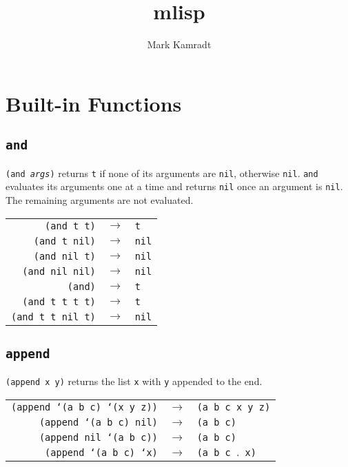 \documentclass[12pt]{article}
\begin{document}
\title{mlisp}
\author{Mark Kamradt}
\maketitle
\section*{Built-in Functions}
\subsection*{\texttt{and}}
\texttt{(and \emph{args})} returns \texttt{t} if none of its arguments are \texttt{nil}, otherwise \texttt{nil}.
\texttt{and} evaluates its arguments one at a time and returns \texttt{nil} once an argument is \texttt{nil}.
The remaining arguments are not evaluated.
\begin{center}
\begin{tabular}{rcl}
\texttt{(and t t)} & $\to$ & \texttt{t} \\
\texttt{(and t nil)} & $\to$ & \texttt{nil} \\
\texttt{(and nil t)} & $\to$ & \texttt{nil} \\
\texttt{(and nil nil)} & $\to$ & \texttt{nil} \\
\texttt{(and)} & $\to$ & \texttt{t} \\
\texttt{(and t t t t)} & $\to$ & \texttt{t} \\
\texttt{(and t t nil t)} & $\to$ & \texttt{nil}
\end{tabular}
\end{center}
\subsection*{\texttt{append}}
\texttt{(append x y)} returns the list \texttt{x} with \texttt{y} appended to the end.
\begin{center}
\begin{tabular}{rcl}
\texttt{(append `(a b c) `(x y z))} & $\to$ & \texttt{(a b c x y z)} \\
\texttt{(append `(a b c) nil)} & $\to$ & \texttt{(a b c)} \\
\texttt{(append nil `(a b c))} & $\to$ & \texttt{(a b c)} \\
\texttt{(append `(a b c) `x)} & $\to$ & \texttt{(a b c $.$ x)}
\end{tabular}
\end{center}
\end{document}
